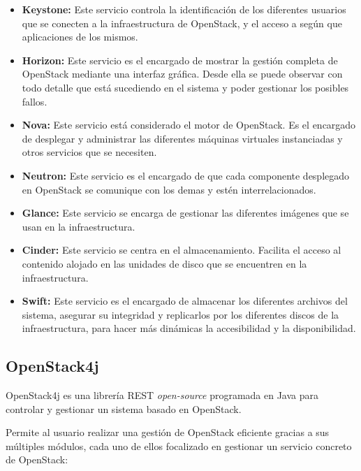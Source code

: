 \begin{itemize}
	\item \textbf{Keystone:}  Este servicio controla la identificación de los diferentes usuarios que se conecten a la infraestructura de OpenStack, y el acceso a según que aplicaciones de los mismos.
	
	\item \textbf{Horizon:} Este servicio es el encargado de mostrar la gestión completa de OpenStack mediante una interfaz gráfica. Desde ella se puede observar con todo detalle que está sucediendo en el sistema y poder gestionar los posibles fallos.
	
	\item \textbf{Nova:} Este servicio está considerado el motor de OpenStack. Es el encargado de desplegar y administrar las diferentes máquinas virtuales instanciadas y otros servicios que se necesiten.
	
	\item \textbf{Neutron:} Este servicio es el encargado de que cada componente desplegado en OpenStack se comunique con los demas y estén interrelacionados.
	
	\item \textbf{Glance:} Este servicio se encarga de gestionar las diferentes imágenes que se usan en la infraestructura.
	
	\item \textbf{Cinder:} Este servicio se centra en el almacenamiento. Facilita el acceso al contenido alojado en las unidades de disco que se encuentren en la infraestructura.
	
	\item \textbf{Swift:} Este servicio es el encargado de almacenar los diferentes archivos del sistema, asegurar su integridad y replicarlos por los diferentes discos de la infraestructura, para hacer más dinámicas la accesibilidad y la disponibilidad.
\end{itemize}

\subsection{OpenStack4j}
\label{subsec:openstack4j}

OpenStack4j es una librería REST \textit{open-source} programada en Java para controlar y gestionar un sistema basado en OpenStack.

Permite al usuario realizar una gestión de OpenStack eficiente gracias a sus múltiples módulos, cada uno de ellos focalizado en gestionar un servicio concreto de OpenStack:


